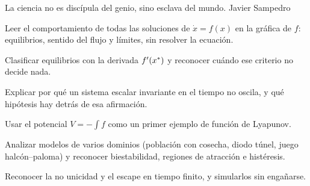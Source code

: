 
  {La ciencia no es discípula del genio, sino esclava del mundo.}
  {Javier Sampedro}

\begin{objetivos}
  \item Leer el comportamiento de todas las soluciones de $\dot x=f(x)$ en la gráfica de $f$: equilibrios, sentido del flujo y límites, sin resolver la ecuación.
  \item Clasificar equilibrios con la derivada $f'(x^{*})$ y reconocer cuándo ese criterio no decide nada.
  \item Explicar por qué un sistema escalar invariante en el tiempo no oscila, y qué hipótesis hay detrás de esa afirmación.
  \item Usar el potencial $V=-\int f$ como un primer ejemplo de función de Lyapunov.
  \item Analizar modelos de varios dominios (población con cosecha, diodo túnel, juego halcón--paloma) y reconocer biestabilidad, regiones de atracción e histéresis.
  \item Reconocer la no unicidad y el escape en tiempo finito, y simularlos sin engañarse.
\end{objetivos}











